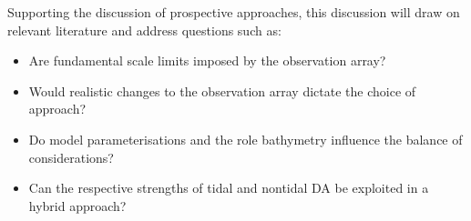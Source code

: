 Supporting the discussion of prospective approaches, this discussion will draw on relevant literature and address questions such as:
\begin{itemize}
\item Are fundamental scale limits imposed by the observation array? \\
\item Would realistic changes to the observation array dictate the choice of approach? 
\item Do model parameterisations and the role bathymetry influence the balance of considerations?
\item Can the respective strengths of tidal and nontidal DA be exploited in a hybrid approach? 
\end{itemize}













